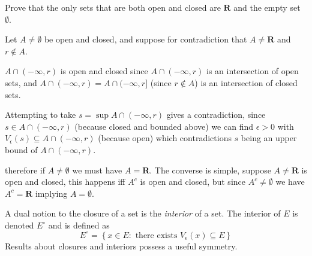 \begin{exercise}
  Prove that the only sets that are both open and closed are $\mathbf{R}$ and the empty set $\emptyset$.
\end{exercise}

\begin{solution}
  Let $A \ne \emptyset$ be open and closed, and suppose for contradiction that $A \ne \mathbf R$ and $r \notin A$.

  $A \cap (-\infty, r)$ is open and closed since $A \cap (-\infty, r)$ is an intersection of open sets, and $A \cap (-\infty, r) = A \cap (-\infty, r]$ (since $r \notin A$) is an intersection of closed sets.

  Attempting to take $s = \sup A \cap (-\infty, r)$ gives a contradiction, since $s \in A \cap (-\infty, r)$ (because closed and bounded above) we can find $\epsilon > 0$ with $V_\epsilon(s) \subseteq A \cap (-\infty, r)$ (because open) which contradictions $s$ being an upper bound of $A \cap (-\infty, r)$.

  therefore if $A \ne \emptyset$ we must have $A = \mathbf{R}$. The converse is simple, suppose $A \ne \mathbf{R}$ is open and closed, this happens iff $A^c$ is open and closed, but since $A^c \ne \emptyset$ we have $A^c = \mathbf{R}$ implying $A = \emptyset$.
\end{solution}

\begin{exercise}
  A dual notion to the closure of a set is the \emph{interior} of a set. The interior of $E$ is denoted $E^{\circ}$ and is defined as
  $$
  E^{\circ}=\left\{x \in E: \text { there exists } V_{\epsilon}(x) \subseteq E\right\}
  $$
  Results about closures and interiors possess a useful symmetry.
\end{exercise}

